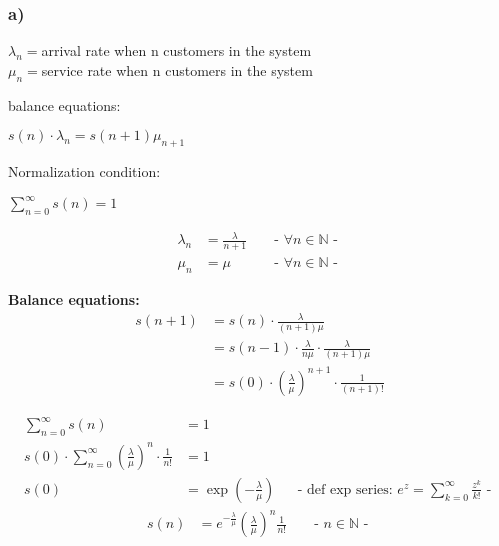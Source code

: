 
\subsubsection*{ a) }

$\lambda _{n}=$arrival rate when n customers in the system\\
$\mu _{n}=$service rate when n customers in the system

balance equations:

$s\left(n\right)\cdot \lambda _{n}=s\left(n+1\right)\mu _{{n+1}}$

Normalization condition:

$\sum _{{n=0}}^{\infty }s\left(n\right)=1$

\begin{align*}
\lambda _{n}&=\frac{\lambda }{n+1} && \text{ - $\forall n\in \mathbb{N}$ - }\\
\mu _{n }&=\mu && \text{ - $\forall n\in \mathbb{N}$ - }
\end{align*}

\textbf{Balance equations:}
\begin{align*}
s\left(n+1\right)&=s\left(n\right)\cdot \frac{\lambda }{\left(n+1\right)\mu }\\
&=s\left(n-1\right)\cdot \frac{\lambda }{n\mu }\cdot \frac{\lambda }{\left(n+1\right)\mu }\\
&=s\left(0\right)\cdot \left(\frac{\lambda }{\mu }\right)^{{n+1}}\cdot \frac{1}{\left(n+1\right)!}
\end{align*}

\begin{align*}
\sum _{{n=0}}^{\infty }s\left(n\right)&=1\\
s\left(0\right)\cdot \sum _{{n=0}}^{\infty }\left(\frac{\lambda }{\mu }\right)^{n}\cdot \frac{1}{n!} &= 1\\
s\left(0\right)&=\exp \left(-\frac{\lambda }{\mu }\right) && \text{- def exp series:  $e^z = \sum_{k=0}^{\infty} \frac{z^k}{k!}$ - }
\end{align*}
\begin{align*}
s\left(n\right)&=e^{{-\frac{\lambda }{\mu }}}\left(\frac{\lambda }{\mu }\right)^{n}\frac{1}{n!} && \text{ - $n\in \mathbb{N}$ - }
\end{align*}

